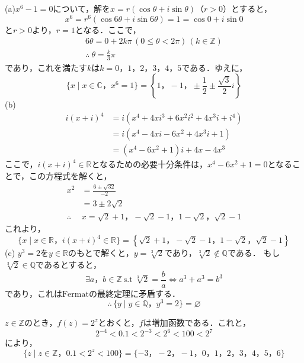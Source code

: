 \documentclass[dvipdfmx,uplatex,11pt]{jsarticle}
\begin{document}
\begin{leftbar}
    (a)\quad $x^6 -1 =0$について，解を$x=r(\cos \theta + i \sin \theta)$（$r>0$）とすると，
    \[
        x^6 = r^6 (\cos 6 \theta + i \sin 6 \theta)=1 =\cos 0 + i \sin 0
    \]
    と$r>0$より，$r=1$となる．ここで，
    \begin{gather*}
        6 \theta = 0 + 2k\pi \, (0 \le \theta <2 \pi ) \, (k \in \mathbb{Z}) \\
        \therefore ~ \theta =\frac{k}{3}\pi 
    \end{gather*}
    であり，これを満たす$k$は$k=0，1，2，3，4，5$である．ゆえに，
    \[
        \{x \mid x \in \mathbb{C}，x^6=1\} = \left \{1，-1，\pm \frac{1}{2} \pm \frac{\sqrt{3}}{2} i \right \}
    \]
    (b) 
    \begin{align*}
    i(x+i)^4&=i(x^4 + 4 x i^3 +6 x^2 i^2 + 4x^3 i +i^4) \\
    & = i(x^4 -4 xi -6x^2 + 4x^3 i+1) \\
    & = (x^4-6x^2+1)i + 4x-4x^3
    \end{align*}
    ここで，$i(x+i)^4 \in \mathbb{R}$となるための必要十分条件は，$x^4-6x^2+1=0$となることで，この方程式を解くと，
    \begin{align*}
        x^2 &= \frac{6\pm \sqrt{32}}{-2} \\
        & = 3 \pm 2 \sqrt{2} \\
        \therefore & x= \sqrt{2}+1 ，-\sqrt{2}-1，1-\sqrt{2}，\sqrt{2}-1
    \end{align*}
    これより，
    \[
        \{x \mid x \in \mathbb{R}，i(x+i)^4 \in \mathbb{R}\} = \left \{  \sqrt{2}+1 ，-\sqrt{2}-1，1-\sqrt{2}，\sqrt{2}-1 \right \}
        \]
(c) \quad $y^3 =2$を$y \in \mathbb{R}$のもとで解くと，$y=\sqrt[3]{2}$であり，$\sqrt[3]{2} \notin \mathbb{Q}$である．
もし$\sqrt[3]{2} \in \mathbb{Q}$であるとすると，
\[
    \exists a，b \in \mathbb{Z} ~ \mathrm{s.t} ~ \sqrt[3]{2} = \frac{b}{a} \iff a^3 + a^3=b^3
\]
であり，これは$\mathrm{Fermat}$の最終定理に矛盾する．
\[
    \therefore \, \{y \mid y \in \mathbb{Q}，y^3=2 \} = \varnothing
\]
\end{leftbar}

\begin{leftbar}
    $z \in \mathbb{Z}$のとき，$f(z)=2^z$とおくと，$f$は増加函数である．これと，
    \[
        2^{-4} < 0.1 < 2^{-3} < 2^6<100<2^7
    \]
    により，
    \[
        \{z \mid z \in \mathbb{Z}，0.1<2^z<100\} = \{-3，-2，-1，0，1，2，3，4，5，6\}
    \]
\end{leftbar}
\end{document}
